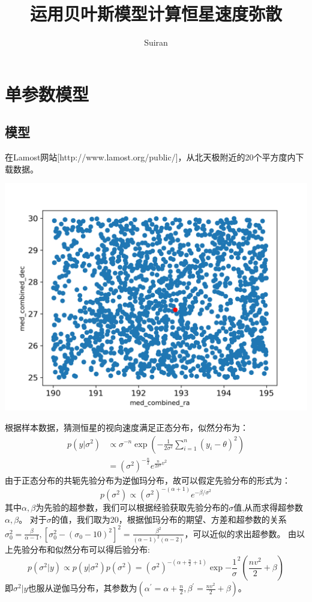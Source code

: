 \documentclass[12pt, letterpaper]{article}
\title{运用贝叶斯模型计算恒星速度弥散}
\author{Suiran}
\begin{document}
\maketitle

\newpage
\section{单参数模型}
\subsection{模型}
在Lamost网站[http://www.lamost.org/public/]，从北天极附近的20个平方度内下载数据。

\includegraphics[scale=0.7]{3_0.png}

根据样本数据，猜测恒星的视向速度满足正态分布，似然分布为：
$$\begin{aligned}
p(y|\sigma^2)&\propto \sigma^{-n}\exp\left(-\frac{1}{2\sigma^2}\sum^{n}_{i=1}(y_i-\theta)^2\right) \\
&=(\sigma^2)^{-\frac{n}{2}}e^{\frac{n}{2\sigma^2}v^2} 
\end{aligned}
$$
由于正态分布的共轭先验分布为逆伽玛分布，故可以假定先验分布的形式为：
$$p(\sigma^2)\propto(\sigma^2)^{-(\alpha+1)}e^{-\beta/\sigma^2}$$
其中$\alpha,\beta$为先验的超参数，我们可以根据经验获取先验分布的$\sigma$值,从而求得超参数$\alpha,\beta$。
对于$\sigma$的值，我们取为20，根据伽玛分布的期望、方差和超参数的关系$\sigma^2_0=\frac{\beta}{\alpha-1},[\sigma_0^2-(\sigma_0-10)^2]^2=\frac{\beta^2}{(\alpha-1)^2(\alpha-2)}$，可以近似的求出超参数。
由以上先验分布和似然分布可以得后验分布:
$$p(\sigma^2|y)\propto p(y|\sigma^2)p(\sigma^2)=(\sigma^2)^{-(\alpha+\frac n2+1)}\exp{-\frac 1\sigma^2(\frac{nv^2}{2}+\beta)}$$
即$\sigma^2|y$也服从逆伽马分布，其参数为$(\alpha^{\prime}=\alpha+\frac n2,\beta^{\prime}=\frac{nv^2}{2}+\beta)$。
\end{document}
